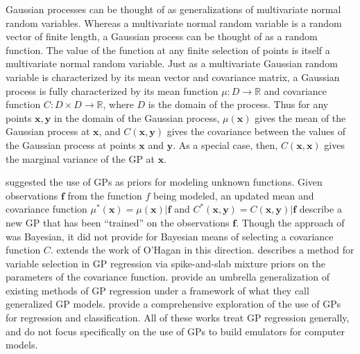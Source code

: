 \documentclass{article}
\begin{document}
Gaussian processes can be thought of as generalizations of multivariate normal random variables. Whereas a multivariate normal random variable is a random vector of finite length, a Gaussian process can be thought of as a random function. The value of the function at any finite selection of points is itself a multivariate normal random variable. Just as a multivariate Gaussian random variable is characterized by its mean vector and covariance matrix, a Gaussian process is fully characterized by its mean function $\mu:D\to \mathbb R$ and covariance function $C:D\times D\to \mathbb R$, where $D$ is the domain of the process. Thus for any points $\mathbf x,\mathbf y$ in the domain of the Gaussian process, $\mu(\mathbf x)$ gives the mean of the Gaussian process at $\mathbf x$, and $C(\mathbf x, \mathbf y)$ gives the covariance between the values of the Gaussian process at points $\mathbf x$ and $\mathbf y$. As a special case, then, $C(\mathbf x,\mathbf x)$ gives the marginal variance of the GP at $\mathbf x$. 


\cite{OHagan1978} suggested the use of GPs as priors for modeling unknown functions. Given observations $\mathbf f$ from the function $f$ being modeled, an updated mean and covariance function $\mu^*(\mathbf x)=\mu(\mathbf x)|\mathbf f$ and $C^*(\mathbf x,\mathbf y) = C(\mathbf x,\mathbf y)|\mathbf f$ describe a new GP that has been ``trained'' on the observations $\mathbf f$. 
Though the approach of \cite{OHagan1978} was Bayesian, it did not provide for Bayesian means of selecting a covariance function $C$. \cite{Neal} extends the work of O'Hagan in this direction. \cite{Savitsky2011} describes a method for variable selection in GP regression via spike-and-slab mixture priors on the parameters of the covariance function. \cite{Shang2013} provide an umbrella generalization of existing methods of GP regression under a framework of what they call generalized GP models. \cite{Rasmussen2006} provide a comprehensive exploration of the use of GPs for regression and classification. All of these works treat GP regression generally, and do not focus specifically on the use of GPs to build emulators for computer models.
\end{document}
